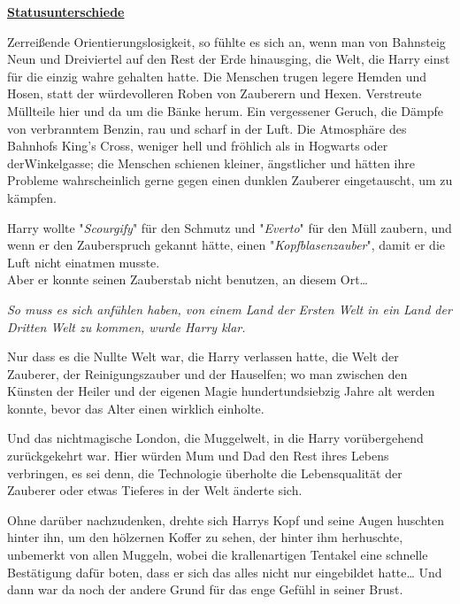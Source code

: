 

\hypertarget{statusunterschiede}{%

\textbf{\uline{Statusunterschiede}}

Zerreißende Orientierungslosigkeit, so fühlte es sich an, wenn man von Bahnsteig Neun und Dreiviertel auf den Rest der Erde hinausging, die Welt, die Harry einst für die einzig wahre gehalten hatte. Die Menschen trugen legere Hemden und Hosen, statt der würdevolleren Roben von Zauberern und Hexen. Verstreute Müllteile hier und da um die Bänke herum. Ein vergessener Geruch, die Dämpfe von verbranntem Benzin, rau und scharf in der Luft. Die Atmosphäre des Bahnhofs King's Cross, weniger hell und fröhlich als in Hogwarts oder derWinkelgasse; die Menschen schienen kleiner, ängstlicher und hätten ihre Probleme wahrscheinlich gerne gegen einen dunklen Zauberer eingetauscht, um zu kämpfen.

Harry wollte "\emph{Scourgify}" für den Schmutz und "\emph{Everto}" für den Müll zaubern, und wenn er den Zauberspruch gekannt hätte, einen "\emph{Kopfblasenzauber}", damit er die Luft nicht einatmen musste.\\ Aber er konnte seinen Zauberstab nicht benutzen, an diesem Ort…

\emph{So muss es sich anfühlen haben, von einem Land der Ersten Welt in ein Land der Dritten Welt zu kommen, wurde Harry klar.}

Nur dass es die Nullte Welt war, die Harry verlassen hatte, die Welt der Zauberer, der Reinigungszauber und der Hauselfen; wo man zwischen den Künsten der Heiler und der eigenen Magie hundertundsiebzig Jahre alt werden konnte, bevor das Alter einen wirklich einholte.

Und das nichtmagische London, die Muggelwelt, in die Harry vorübergehend zurückgekehrt war. Hier würden Mum und Dad den Rest ihres Lebens verbringen, es sei denn, die Technologie überholte die Lebensqualität der Zauberer oder etwas Tieferes in der Welt änderte sich.

Ohne darüber nachzudenken, drehte sich Harrys Kopf und seine Augen huschten hinter ihn, um den hölzernen Koffer zu sehen, der hinter ihm herhuschte, unbemerkt von allen Muggeln, wobei die krallenartigen Tentakel eine schnelle Bestätigung dafür boten, dass er sich das alles nicht nur eingebildet hatte… Und dann war da noch der andere Grund für das enge Gefühl in seiner Brust.

}
